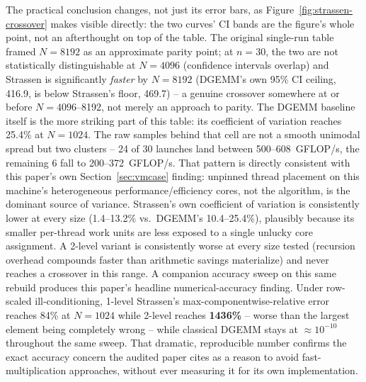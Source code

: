 \documentclass[acmsmall]{acmart}
\begin{document}
The practical conclusion changes, not just its error bars, as
Figure~\ref{fig:strassen-crossover} makes visible directly: the two
curves' CI bands are the figure's whole point, not an afterthought on
top of the table. The original single-run table framed $N{=}8192$ as an
approximate parity point; at $n{=}30$, the two are not statistically
distinguishable at $N{=}4096$ (confidence intervals overlap) and
Strassen is significantly \emph{faster} by $N{=}8192$ (DGEMM's own 95\%
CI ceiling, 416.9, is below Strassen's floor, 469.7) -- a genuine
crossover somewhere at or before $N{=}4096$--8192, not merely an
approach to parity. The DGEMM baseline itself is the more striking part
of this table: its
coefficient of variation reaches 25.4\% at $N{=}1024$. The raw samples
behind that cell are not a smooth unimodal spread but two clusters -- 24
of 30 launches land between 500--608~GFLOP/s, the remaining 6 fall to
200--372~GFLOP/s. That pattern is directly consistent with this paper's
own Section~\ref{sec:vmcase} finding: unpinned thread placement on this
machine's heterogeneous performance/efficiency cores, not the
algorithm, is the dominant source of variance. Strassen's own
coefficient of variation is consistently lower at every size
(1.4--13.2\% vs.\ DGEMM's 10.4--25.4\%), plausibly because its smaller
per-thread work units are less exposed to a single unlucky core
assignment. A 2-level
variant is consistently worse at every size tested (recursion
overhead compounds faster than arithmetic savings materialize) and
never reaches a crossover in this range. A companion accuracy sweep on
this same rebuild produces this paper's headline numerical-accuracy
finding. Under row-scaled ill-conditioning, 1-level Strassen's
max-componentwise-relative error reaches 84\% at $N{=}1024$ while
2-level reaches \textbf{1436\%} -- worse than the largest element being
completely wrong -- while classical DGEMM stays at $\approx10^{-10}$
throughout the same sweep. That dramatic, reproducible number confirms
the exact accuracy concern the audited paper cites as a reason to avoid
fast-multiplication approaches, without ever measuring it for its own
implementation.
\end{document}
